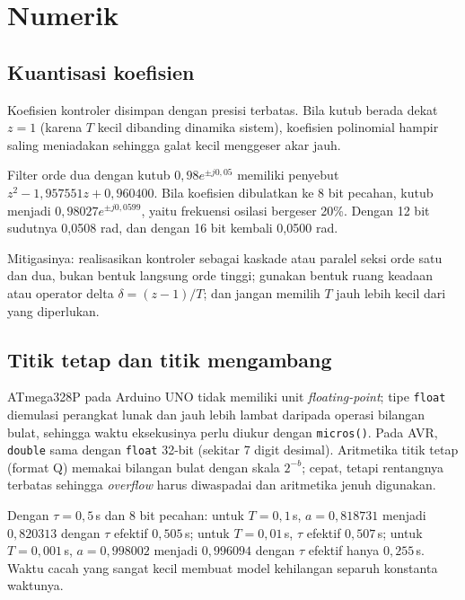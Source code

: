 \section{Numerik}
\subsection{Kuantisasi koefisien}
Koefisien kontroler disimpan dengan presisi terbatas. Bila kutub berada dekat $z = 1$ (karena $T$ kecil dibanding dinamika sistem), koefisien polinomial hampir saling meniadakan sehingga galat kecil menggeser akar jauh.

\begin{contoh}
	Filter orde dua dengan kutub $0{,}98e^{\pm j0{,}05}$ memiliki penyebut $z^2 - 1{,}957551z + 0{,}960400$. Bila koefisien dibulatkan ke 8 bit pecahan, kutub menjadi $0{,}98027e^{\pm j0{,}0599}$, yaitu frekuensi osilasi bergeser 20\%. Dengan 12 bit sudutnya 0,0508 rad, dan dengan 16 bit kembali 0,0500 rad.
\end{contoh}

Mitigasinya: realisasikan kontroler sebagai kaskade atau paralel seksi orde satu dan dua, bukan bentuk langsung orde tinggi; gunakan bentuk ruang keadaan atau operator delta $\delta = (z-1)/T$; dan jangan memilih $T$ jauh lebih kecil dari yang diperlukan.

\subsection{Titik tetap dan titik mengambang}
ATmega328P pada Arduino UNO tidak memiliki unit \textit{floating-point}; tipe \texttt{float} diemulasi perangkat lunak dan jauh lebih lambat daripada operasi bilangan bulat, sehingga waktu eksekusinya perlu diukur dengan \texttt{micros()}. Pada AVR, \texttt{double} sama dengan \texttt{float} 32-bit (sekitar 7 digit desimal). Aritmetika titik tetap (format Q) memakai bilangan bulat dengan skala $2^{-b}$; cepat, tetapi rentangnya terbatas sehingga \textit{overflow} harus diwaspadai dan aritmetika jenuh digunakan.

\begin{contoh}[Koefisien $a = e^{-T/\tau}$ dalam Q8]
	Dengan $\tau = 0{,}5$\,s dan 8 bit pecahan: untuk $T = 0{,}1$\,s, $a = 0{,}818731$ menjadi $0{,}820313$ dengan $\tau$ efektif $0{,}505$\,s; untuk $T = 0{,}01$\,s, $\tau$ efektif $0{,}507$\,s; untuk $T = 0{,}001$\,s, $a = 0{,}998002$ menjadi $0{,}996094$ dengan $\tau$ efektif hanya $0{,}255$\,s. Waktu cacah yang sangat kecil membuat model kehilangan separuh konstanta waktunya.
\end{contoh}

